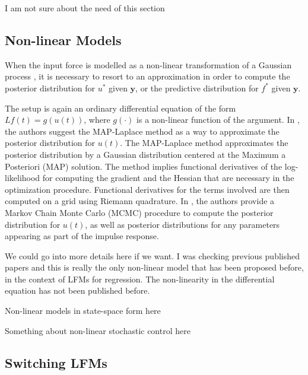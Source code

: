 \documentclass[journal]{IEEEtran}
\newcommand{\mauricio}[1]{{\color{blue}#1}}
\newcommand{\simo}[1]{{\color{red}#1}}
\begin{document}
\simo{I am not sure about the need of this section}

\subsection{Non-linear Models}

When the input force is modelled as a non-linear transformation of a Gaussian process \cite{Lawrence:gpsim2007a,
Gao:latent08, Titsias:BMC:2012}, it is necessary to resort to an approximation in order to compute the posterior
distribution for $u^*$ given $\mathbf{y}$, or the predictive distribution for $f^*$ given $\mathbf{y}$.

The setup is again an ordinary differential equation of the form $Lf(t)=g(u(t))$, where $g(\cdot)$ is a non-linear function
of the argument. In \cite{Lawrence:gpsim2007a, Gao:latent08}, the authors suggest the MAP-Laplace method
\cite{Bishop:PRML06} as a way to approximate the posterior distribution for $u(t)$. The MAP-Laplace method approximates
the posterior distribution by a
Gaussian distribution centered at the Maximum a Posteriori (MAP) solution. The method implies functional derivatives of the
log-likelihood for computing the gradient and the Hessian that are necessary in the optimization procedure. Functional
derivatives for the terms involved are then computed on a grid using Riemann quadrature. In \cite{Titsias:BMC:2012}, the
authors provide a Markov Chain Monte Carlo (MCMC) procedure to compute the posterior distribution for $u(t)$, as well
as posterior distributions for any parameters appearing as part of the impulse response.

\mauricio{We could go into more details here if we want. I was checking previous published papers and this is really
the only non-linear model that has been proposed before, in the context of LFMs for regression. The non-linearity in the
differential equation has not been published before}.


\simo{Non-linear models in state-space form here}

\simo{Something about non-linear stochastic control here}


\subsection{Switching LFMs}
\end{document}
